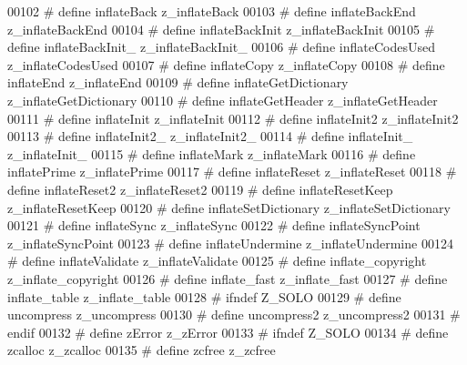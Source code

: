 \begin{DoxyCode}
00102 \textcolor{preprocessor}{#  define inflateBack           z\_inflateBack}
00103 \textcolor{preprocessor}{#  define inflateBackEnd        z\_inflateBackEnd}
00104 \textcolor{preprocessor}{#  define inflateBackInit       z\_inflateBackInit}
00105 \textcolor{preprocessor}{#  define inflateBackInit\_      z\_inflateBackInit\_}
00106 \textcolor{preprocessor}{#  define inflateCodesUsed      z\_inflateCodesUsed}
00107 \textcolor{preprocessor}{#  define inflateCopy           z\_inflateCopy}
00108 \textcolor{preprocessor}{#  define inflateEnd            z\_inflateEnd}
00109 \textcolor{preprocessor}{#  define inflateGetDictionary  z\_inflateGetDictionary}
00110 \textcolor{preprocessor}{#  define inflateGetHeader      z\_inflateGetHeader}
00111 \textcolor{preprocessor}{#  define inflateInit           z\_inflateInit}
00112 \textcolor{preprocessor}{#  define inflateInit2          z\_inflateInit2}
00113 \textcolor{preprocessor}{#  define inflateInit2\_         z\_inflateInit2\_}
00114 \textcolor{preprocessor}{#  define inflateInit\_          z\_inflateInit\_}
00115 \textcolor{preprocessor}{#  define inflateMark           z\_inflateMark}
00116 \textcolor{preprocessor}{#  define inflatePrime          z\_inflatePrime}
00117 \textcolor{preprocessor}{#  define inflateReset          z\_inflateReset}
00118 \textcolor{preprocessor}{#  define inflateReset2         z\_inflateReset2}
00119 \textcolor{preprocessor}{#  define inflateResetKeep      z\_inflateResetKeep}
00120 \textcolor{preprocessor}{#  define inflateSetDictionary  z\_inflateSetDictionary}
00121 \textcolor{preprocessor}{#  define inflateSync           z\_inflateSync}
00122 \textcolor{preprocessor}{#  define inflateSyncPoint      z\_inflateSyncPoint}
00123 \textcolor{preprocessor}{#  define inflateUndermine      z\_inflateUndermine}
00124 \textcolor{preprocessor}{#  define inflateValidate       z\_inflateValidate}
00125 \textcolor{preprocessor}{#  define inflate\_copyright     z\_inflate\_copyright}
00126 \textcolor{preprocessor}{#  define inflate\_fast          z\_inflate\_fast}
00127 \textcolor{preprocessor}{#  define inflate\_table         z\_inflate\_table}
00128 \textcolor{preprocessor}{#  ifndef Z\_SOLO}
00129 \textcolor{preprocessor}{#    define uncompress            z\_uncompress}
00130 \textcolor{preprocessor}{#    define uncompress2           z\_uncompress2}
00131 \textcolor{preprocessor}{#  endif}
00132 \textcolor{preprocessor}{#  define zError                z\_zError}
00133 \textcolor{preprocessor}{#  ifndef Z\_SOLO}
00134 \textcolor{preprocessor}{#    define zcalloc               z\_zcalloc}
00135 \textcolor{preprocessor}{#    define zcfree                z\_zcfree}

\end{DoxyCode}
